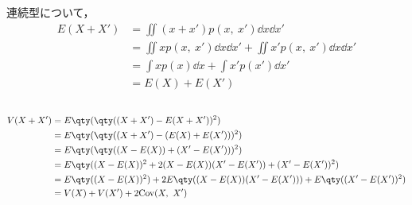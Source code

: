 \documentclass[dvipdfmx, fleqn, titlepage]{jsarticle}
\begin{document}
連続型について，
\begin{align*}
	E(X + X')
	& = \iint (x + x') p(x,\ x') \dd x \dd x' \\
	& = \iint x p(x,\ x') \dd x \dd x' + \iint x' p(x,\ x') \dd x \dd x' \\
	& = \int x p(x) \dd x + \int x' p(x') \dd x' \\
	& = E(X) + E(X')
\end{align*}


\subsection{}
\begin{align*}
	V(X + X')
	& = E\qty( \qty((X+X') - E(X+X'))^2 ) \\
	& = E\qty( \qty((X+X') - (E(X)+E(X')))^2 ) \\
	& = E\qty( \qty((X - E(X)) + (X' - E(X')))^2 ) \\
	& = E\qty( (X - E(X))^2 + 2(X - E(X))(X' - E(X')) + (X' - E(X'))^2 ) \\
	& = E\qty((X - E(X))^2) + 2 E\qty((X - E(X))(X' - E(X'))) + E\qty((X' - E(X'))^2) \\
	& = V(X) + V(X') + 2\mathrm{Cov}(X,\ X')
\end{align*}
\end{document}
